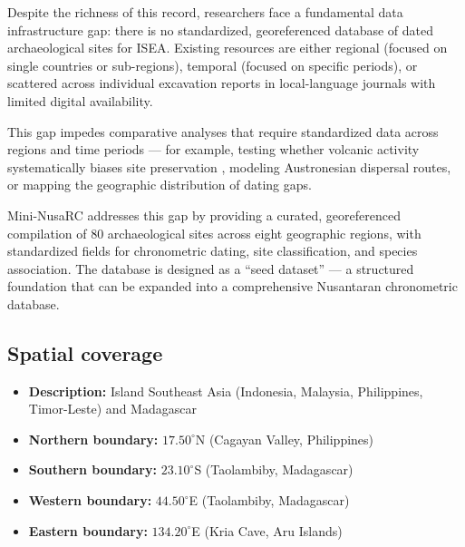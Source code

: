 \documentclass[11pt]{article}
\begin{document}
Despite the richness of this record, researchers face a fundamental data infrastructure gap: there is no standardized, georeferenced database of dated archaeological sites for ISEA. Existing resources are either regional (focused on single countries or sub-regions), temporal (focused on specific periods), or scattered across individual excavation reports in local-language journals with limited digital availability.

This gap impedes comparative analyses that require standardized data across regions and time periods --- for example, testing whether volcanic activity systematically biases site preservation \citep{amien2026taphonomic}, modeling Austronesian dispersal routes, or mapping the geographic distribution of dating gaps.

Mini-NusaRC addresses this gap by providing a curated, georeferenced compilation of 80 archaeological sites across eight geographic regions, with standardized fields for chronometric dating, site classification, and species association. The database is designed as a ``seed dataset'' --- a structured foundation that can be expanded into a comprehensive Nusantaran chronometric database.

\subsection{Spatial coverage}

\begin{itemize}
    \item \textbf{Description:} Island Southeast Asia (Indonesia, Malaysia, Philippines, Timor-Leste) and Madagascar
    \item \textbf{Northern boundary:} $17.50^{\circ}$N (Cagayan Valley, Philippines)
    \item \textbf{Southern boundary:} $23.10^{\circ}$S (Taolambiby, Madagascar)
    \item \textbf{Western boundary:} $44.50^{\circ}$E (Taolambiby, Madagascar)
    \item \textbf{Eastern boundary:} $134.20^{\circ}$E (Kria Cave, Aru Islands)
\end{itemize}
\end{document}
